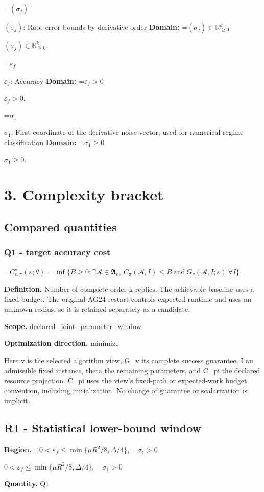 \documentclass[10pt,a4paper]{article}
\newcommand{\AtlasMath}[1]{\par\begingroup\centering\setbox0=\hbox{$\displaystyle #1$}\ifdim\wd0>1.4\linewidth\typeout{ATLAS WIDE FORMULA: \the\wd0}\fi\ifdim\wd0>\linewidth\resizebox{\linewidth}{!}{\box0}\else\box0\fi\par\endgroup}
\newcommand{\AtlasInlineMath}[1]{\begingroup\setbox0=\hbox{$#1$}\ifdim\wd0>.4\linewidth\endgroup\AtlasMath{#1}\else\endgroup$#1$\fi}
\begin{document}
\AtlasInlineMath{(\sigma_j)}: Root-error bounds by derivative order \textbf{Domain:} \AtlasInlineMath{(\sigma_j)\in\mathbb{R}_{\ge0}^k}.

\AtlasInlineMath{\varepsilon_f}: Accuracy \textbf{Domain:} \AtlasInlineMath{\varepsilon_f>0}.

\AtlasInlineMath{\sigma_1}: First coordinate of the derivative-noise vector, used for numerical regime classification \textbf{Domain:} \AtlasInlineMath{\sigma_1\ge0}.

\section{3. Complexity bracket}
\subsection{Compared quantities}
\subsubsection{Q1 - target accuracy cost}
\AtlasMath{C^\star_{v,\pi}(\varepsilon;\theta)=\inf\{B\ge0:\exists\mathcal A\in\mathfrak A_v,\ C_\pi(\mathcal A,I)\le B\ \text{and}\ G_v(\mathcal A,I;\varepsilon)\ \forall I\}}
\textbf{Definition.} Number of complete order-k replies. The achievable baseline uses a fixed budget. The original AG24 restart controls expected runtime and uses an unknown radius, so it is retained separately as a candidate.

\textbf{Scope.} declared\_joint\_parameter\_window

\textbf{Optimization direction.} minimize

Here v is the selected algorithm view, G\_v its complete success guarantee, I an admissible fixed instance, theta the remaining parameters, and C\_pi the declared resource projection. C\_pi uses the view's fixed-path or expected-work budget convention, including initialization. No change of guarantee or scalarization is implicit.

\subsection{R1 - Statistical lower-bound window}
\textbf{Region.} \AtlasInlineMath{0<\varepsilon_f\le\min\{\mu R^2/8,\Delta/4\},\quad\sigma_1>0}

\textbf{Quantity.} Q1
\end{document}
